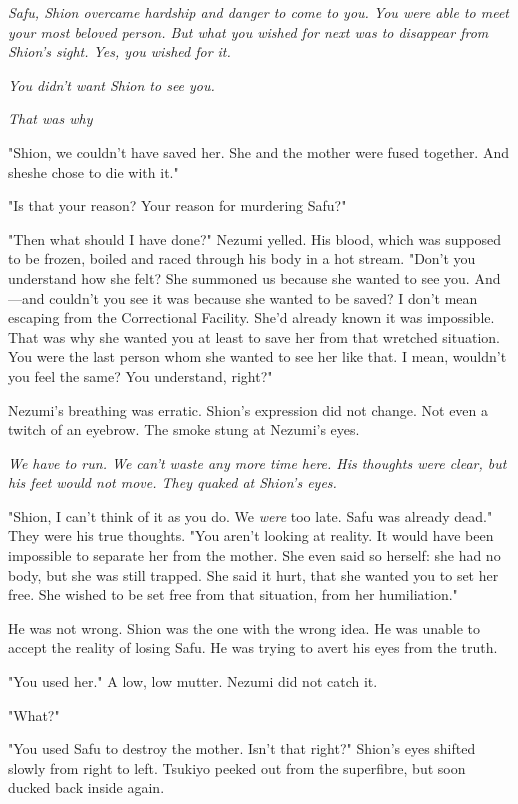 \emph{Safu, Shion overcame hardship and danger to come to you. You were able
to meet your most beloved person. But what you wished for next was to
disappear from Shion's sight. Yes, you wished for it.}

\emph{You didn't want Shion to see you.}

\emph{That was why\el }

"Shion, we couldn't have saved her. She and the mother were fused
together. And she\el she chose to die with it."

"Is that your reason? Your reason for murdering Safu?"

"Then what should I have done?" Nezumi yelled. His blood, which was
supposed to be frozen, boiled and raced through his body in a hot
stream. "Don't you understand how she felt? She summoned us because she
wanted to see you. And---and couldn't you see it was because she wanted to
be saved? I don't mean escaping from the Correctional Facility. She'd
already known it was impossible. That was why she wanted you at least to
save her from that wretched situation. You were the last person whom she
wanted to see her like that. I mean, wouldn't you feel the same? You
understand, right?"

Nezumi's breathing was erratic. Shion's expression did not change. Not
even a twitch of an eyebrow. The smoke stung at Nezumi's eyes.

\emph{We have to run. We can't waste any more time here. His thoughts were
clear, but his feet would not move. They quaked at Shion's eyes.}

"Shion, I can't think of it as you do. We \emph{were} too late. Safu was
already dead." They were his true thoughts. "You aren't looking at
reality. It would have been impossible to separate her from the mother.
She even said so herself: she had no body, but she was still trapped.
She said it hurt, that she wanted you to set her free. She wished to be
set free from that situation, from her humiliation."

He was not wrong. Shion was the one with the wrong idea. He was unable
to accept the reality of losing Safu. He was trying to avert his eyes
from the truth.

"You used her." A low, low mutter. Nezumi did not catch it.

"What?"

"You used Safu to destroy the mother. Isn't that right?" Shion's eyes
shifted slowly from right to left. Tsukiyo peeked out from the
superfibre, but soon ducked back inside again.

